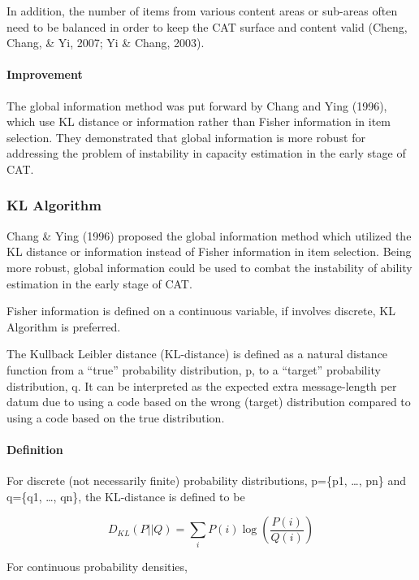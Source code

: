 \documentclass[
]{article}
\begin{document}
In addition, the number of items from various content areas or sub-areas
often need to be balanced in order to keep the CAT surface and content
valid (Cheng, Chang, \& Yi, 2007; Yi \& Chang, 2003).

\hypertarget{improvement}{%
\paragraph{Improvement}\label{improvement}}

The global information method was put forward by Chang and Ying (1996),
which use KL distance or information rather than Fisher information in
item selection. They demonstrated that global information is more robust
for addressing the problem of instability in capacity estimation in the
early stage of CAT.

\hypertarget{kl-algorithm}{%
\subsubsection{KL Algorithm}\label{kl-algorithm}}

Chang \& Ying (1996) proposed the global information method which
utilized the KL distance or information instead of Fisher information in
item selection. Being more robust, global information could be used to
combat the instability of ability estimation in the early stage of CAT.

Fisher information is defined on a continuous variable, if involves
discrete, KL Algorithm is preferred.

The Kullback Leibler distance (KL-distance) is defined as a natural
distance function from a ``true'' probability distribution, p, to a
``target'' probability distribution, q. It can be interpreted as the
expected extra message-length per datum due to using a code based on the
wrong (target) distribution compared to using a code based on the true
distribution.

\hypertarget{definition-2}{%
\paragraph{Definition}\label{definition-2}}

For discrete (not necessarily finite) probability distributions, p=\{p1,
\ldots, pn\} and q=\{q1, \ldots, qn\}, the KL-distance is defined to be

\[D_{KL}(P||Q)=\sum_i P(i)\log\left(\frac {P(i)}{Q(i)}\right)\]

For continuous probability densities,
\end{document}
